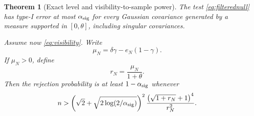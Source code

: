 \documentclass[11pt]{article}
\newtheorem{theorem}{Theorem}[section]
\theoremstyle{definition}
\theoremstyle{remark}
\begin{document}
\begin{theorem}[Exact level and visibility-to-sample power]
\label{thm:wishartpower}
The test \eqref{eq:filterednull} has type-I error at most
$\alpha_{\rm sig}$ for every Gaussian covariance generated by a measure
supported in $[0,\theta]$, including singular covariances.

Assume now \eqref{eq:visibility}.  Write
\begin{equation}
 \mu_N=\delta\gamma-e_N(1-\gamma).                   \label{eq:ratio_constants}
\end{equation}
If $\mu_N>0$, define
\begin{equation}
                         r_N=\frac{\mu_N}{1+\theta}.   \label{eq:rN}
\end{equation}
Then the rejection probability is at least $1-\alpha_{\rm sig}$ whenever
\begin{equation}
 n>
 \left(\sqrt2+\sqrt{2\log(2/\alpha_{\rm sig})}\right)^2
 \frac{\bigl(\sqrt{1+r_N}+1\bigr)^4}{r_N^2}.          \label{eq:samplebound}
\end{equation}
\end{theorem}
\end{document}
